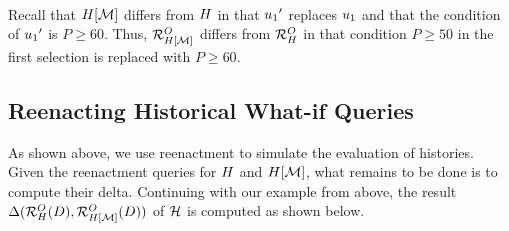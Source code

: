 \begin{exam}
{\begin{minipage}{1.0\linewidth}
\begin{align*}
\end{align*}
\end{minipage}
}

Recall that $H[\mathcal{M}]$ differs from $H$ in that ${u_1}'$ replaces $u_1$ and that the condition of ${u_1}'$ is $P \geq 60$. Thus,
$\mathcal{R}^{O}_{H[\mathcal{M}]}$ differs from $\mathcal{R}^{O}_{H}$ in that condition $P \geq 50$ in the first selection is replaced with $P \geq 60$.
\end{exam}







\subsection{Reenacting Historical What-if Queries}
\label{sec:answ-hist-what}

As shown above, we use reenactment to simulate the evaluation of histories. Given the reenactment queries for $H$ and $H[\mathcal{M}]$, what remains to be done is to compute their delta.
Continuing with our example from above, the result $\Delta(\mathcal{R}^{O}_{H}(D),\mathcal{R}^{O}_{H[\mathcal{M}]}(D))$ of $\mathcal{H}$ is computed as shown below.

